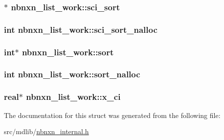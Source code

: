 \hypertarget{structnbnxn__list__work_aca14cc3ac02ac8609e10d24e4314ffc7}{
\subsubsection[{sci\-\_\-sort}]{$\ast$ {\bf nbnxn\-\_\-list\-\_\-work\-::sci\-\_\-sort}}}\label{structnbnxn__list__work_aca14cc3ac02ac8609e10d24e4314ffc7}
\hypertarget{structnbnxn__list__work_a0a2e2d441d977de82be591b523339002}{
\subsubsection[{sci\-\_\-sort\-\_\-nalloc}]{\setlength{\rightskip}{0pt plus 5cm}int {\bf nbnxn\-\_\-list\-\_\-work\-::sci\-\_\-sort\-\_\-nalloc}}}\label{structnbnxn__list__work_a0a2e2d441d977de82be591b523339002}
\hypertarget{structnbnxn__list__work_a2a5788f5b253822c08ac92b030213b63}{
\subsubsection[{sort}]{\setlength{\rightskip}{0pt plus 5cm}int$\ast$ {\bf nbnxn\-\_\-list\-\_\-work\-::sort}}}\label{structnbnxn__list__work_a2a5788f5b253822c08ac92b030213b63}
\hypertarget{structnbnxn__list__work_af56b3b9c154e55c081c82a2e2f559b08}{
\subsubsection[{sort\-\_\-nalloc}]{\setlength{\rightskip}{0pt plus 5cm}int {\bf nbnxn\-\_\-list\-\_\-work\-::sort\-\_\-nalloc}}}\label{structnbnxn__list__work_af56b3b9c154e55c081c82a2e2f559b08}
\hypertarget{structnbnxn__list__work_ae7df54d2ea2bb33d2414fb83e934f104}{
\subsubsection[{x\-\_\-ci}]{\setlength{\rightskip}{0pt plus 5cm}real$\ast$ {\bf nbnxn\-\_\-list\-\_\-work\-::x\-\_\-ci}}}\label{structnbnxn__list__work_ae7df54d2ea2bb33d2414fb83e934f104}


\-The documentation for this struct was generated from the following file\-:\begin{DoxyCompactItemize}
\item 
src/mdlib/\hyperlink{nbnxn__internal_8h}{nbnxn\-\_\-internal.\-h}\end{DoxyCompactItemize}
